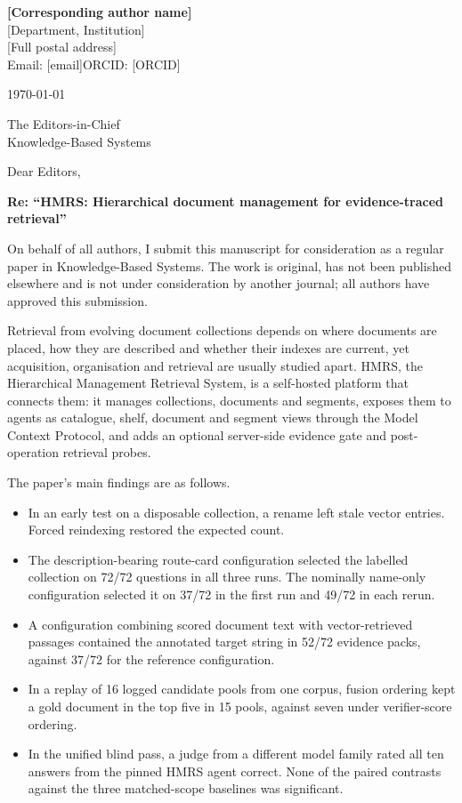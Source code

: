 \documentclass[11pt,a4paper]{article}
\begin{document}
\textbf{[Corresponding author name]}\\
{}[Department, Institution]\\
{}[Full postal address]\\
Email: [email]\quad ORCID: [ORCID]

\today

The Editors-in-Chief\\
Knowledge-Based Systems

Dear Editors,

\textbf{Re: ``HMRS: Hierarchical document management for evidence-traced retrieval''}

On behalf of all authors, I submit this manuscript for consideration as a
regular paper in Knowledge-Based Systems. The work is original, has not
been published elsewhere and is not under consideration by another
journal; all authors have approved this submission.

Retrieval from evolving document collections depends on where documents
are placed, how they are described and whether their indexes are current,
yet acquisition, organisation and retrieval are usually studied apart.
HMRS, the Hierarchical Management Retrieval System, is a self-hosted
platform that connects them: it manages collections, documents and
segments, exposes them to agents as catalogue, shelf, document and
segment views through the Model Context Protocol, and adds an optional
server-side evidence gate and post-operation retrieval probes.

The paper's main findings are as follows.
\begin{itemize}[leftmargin=1.5em,itemsep=1pt,topsep=2pt,parsep=0pt]
\item In an early test on a disposable collection, a rename left stale
vector entries. Forced reindexing restored the expected count.
\item The description-bearing route-card configuration selected the labelled
collection on 72/72 questions in all three runs. The nominally name-only
configuration selected it on 37/72 in the first run and 49/72 in each rerun.
\item A configuration combining scored document text with
vector-retrieved passages contained the annotated target string in 52/72
evidence packs, against 37/72 for the reference configuration.
\item In a replay of 16 logged candidate pools from one corpus, fusion
ordering kept a gold document in the top five in 15 pools, against seven
under verifier-score ordering.
\item In the unified blind pass, a judge from a different model family
rated all ten answers from the pinned HMRS agent correct. None of the
paired contrasts against the three matched-scope baselines was significant.
\end{itemize}
\end{document}
